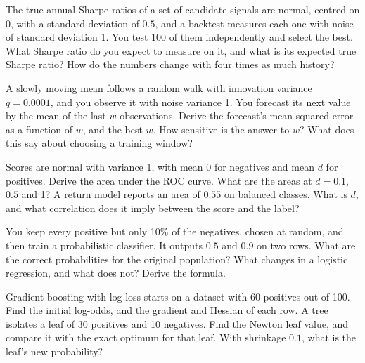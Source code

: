 \begin{question}\label{iq:iv1:machine-learning:32}
The true annual Sharpe ratios of a set of candidate signals are normal, centred on 0, with a standard deviation of $0.5$, and a backtest measures each one with noise of standard deviation 1. You test 100 of them independently and select the best. What Sharpe ratio do you expect to measure on it, and what is its expected true Sharpe ratio? How do the numbers change with four times as much history?
\end{question}

\begin{question}\label{iq:iv1:machine-learning:33}
A slowly moving mean follows a random walk with innovation variance $q = 0.0001$, and you observe it with noise variance 1. You forecast its next value by the mean of the last $w$ observations. Derive the forecast's mean squared error as a function of $w$, and the best $w$. How sensitive is the answer to $w$? What does this say about choosing a training window?
\end{question}

\begin{question}\label{iq:iv1:machine-learning:34}
Scores are normal with variance 1, with mean 0 for negatives and mean $d$ for positives. Derive the area under the ROC curve. What are the areas at $d = 0.1$, $0.5$ and 1? A return model reports an area of $0.55$ on balanced classes. What is $d$, and what correlation does it imply between the score and the label?
\end{question}

\begin{question}\label{iq:iv1:machine-learning:35}
You keep every positive but only 10\% of the negatives, chosen at random, and then train a probabilistic classifier. It outputs $0.5$ and $0.9$ on two rows. What are the correct probabilities for the original population? What changes in a logistic regression, and what does not? Derive the formula.
\end{question}

\begin{question}\label{iq:iv1:machine-learning:36}
Gradient boosting with log loss starts on a dataset with 60 positives out of 100. Find the initial log-odds, and the gradient and Hessian of each row. A tree isolates a leaf of 30 positives and 10 negatives. Find the Newton leaf value, and compare it with the exact optimum for that leaf. With shrinkage $0.1$, what is the leaf's new probability?
\end{question}

